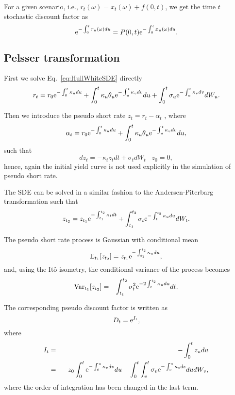 For a given scenario, i.e., $r_t(\omega) = x_t (\omega) + f(0,t)$, we get the 
time $t$ stochastic discount factor as
\begin{equation}
\text{e}^{- \int_0^t r_u (\omega) du} = P(0,t) \text{e}^{- \int_0^t x_u (\omega) du}.
\end{equation}


\subsection{Pelsser transformation}
First we solve Eq.~\ref{eq:HullWhiteSDE} directly
\begin{equation}
r_{t} = r_{0} \text{e}^{-\int_{0}^{t} \kappa_u du}  + \int_{0}^{t} \kappa_u \theta_u \text{e}^{-\int_u^{t} \kappa_v dv} du + \int_{0}^{t} \sigma_u \text{e}^{-\int_u^{t} \kappa_v dv} dW_u.
\end{equation}

Then we introduce the pseudo short rate $z_t = r_t - \alpha_t$ \cite{Pelsser2000}, where 
\begin{equation}
\alpha_t = r_{0} \text{e}^{-\int_{0}^{t} \kappa_u du}  + \int_{0}^{t} \kappa_u \theta_u \text{e}^{-\int_u^{t} \kappa_v dv} du,
\end{equation}
such that
\begin{equation}
dz_t = - \kappa_t z_t dt + \sigma_t dW_t \;\;\; z_0 = 0,
\end{equation}
hence, again the initial yield curve is not used explicitly in the simulation of pseudo short rate.

The SDE can be solved in a similar fashion to the Andersen-Piterbarg transformation such that
\begin{equation}
z_{t_2} = z_{t_1} \text{e}^{-\int_{t_1}^{t_2} \kappa_t dt} + \int_{t_1}^{t_2} \sigma_t \text{e}^{-\int_t^{t_2} \kappa_u du} dW_t.
\end{equation}

The pseudo short rate process is Gaussian with conditional mean
\begin{equation}
\mathrm{E}_{t_1}\! \left[ z_{t_2} \right] = z_{t_1} \text{e}^{-\int_{t_1}^{t_2} \kappa_u du},
\end{equation}
and, using the It\^{o} isometry, the conditional variance of the process becomes
\begin{eqnarray}
\mathrm{Var}_{t_1}\! \left[ z_{t_2} \right] &=& \int_{t_1}^{t_2} \sigma_t^2 \text{e}^{-2\int_t^{t_2} \kappa_u du} dt.
\end{eqnarray}

The corresponding pseudo discount factor is written as
\begin{equation}
D_{t} = \text{e}^{I_t},
\end{equation}
where
\begin{eqnarray}
I_t &=& -\int_0^t z_u du \\
&=& - z_{0} \int_0^t \text{e}^{-\int_{0}^{u} \kappa_v dv} du - \int_0^t \int_{v}^{t} \sigma_v \text{e}^{-\int_v^{u} \kappa_s ds} du dW_v,
\end{eqnarray}
where the order of integration has been changed in the last term.

